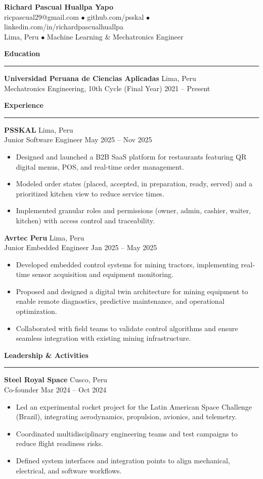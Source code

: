 \documentclass[11pt,letterpaper]{article}
\newcommand{\resumeheader}[3]{
    \begin{center}
        \textbf{#1} \\
        #2 \\
        #3
    \end{center}
}
\newcommand{\resumesection}[1]{
    \vspace{0.5em}
    \noindent\textbf{#1}
    \vspace{0.2em}
    \hrule
    \vspace{0.3em}
}
\newcommand{\resumeentry}[4]{
    \textbf{#1} \hfill #2 \\
    #3 \hfill #4
}
\newcommand{\resumesubentry}[1]{
    \begin{itemize}[leftmargin=*,topsep=0pt,itemsep=2pt]
        #1
    \end{itemize}
    \vspace{0.3em}
}
\begin{document}
\resumeheader{Richard Pascual Huallpa Yapo}{
    ricpascual29@gmail.com $\bullet$ github.com/psskal $\bullet$ linkedin.com/in/richardpascualhuallpa \\
    Lima, Peru $\bullet$ Machine Learning \& Mechatronics Engineer
}{}

\vspace{1em}

\resumesection{Education}

\resumeentry{Universidad Peruana de Ciencias Aplicadas}{Lima, Peru}
{Mechatronics Engineering, 10th Cycle (Final Year)}{2021 -- Present}

\resumesection{Experience}

\resumeentry{PSSKAL}{Lima, Peru}
{Junior Software Engineer}{May 2025 -- Nov 2025}
\resumesubentry{
    \item Designed and launched a B2B SaaS platform for restaurants featuring QR digital menus, POS, and real-time order management.
    \item Modeled order states (placed, accepted, in preparation, ready, served) and a prioritized kitchen view to reduce service times.
    \item Implemented granular roles and permissions (owner, admin, cashier, waiter, kitchen) with access control and traceability.
}

\resumeentry{Avrtec Peru}{Lima, Peru}
{Junior Embedded Engineer}{Jan 2025 -- May 2025}
\resumesubentry{
    \item Developed embedded control systems for mining tractors, implementing real-time sensor acquisition and equipment monitoring.
    \item Proposed and designed a digital twin architecture for mining equipment to enable remote diagnostics, predictive maintenance, and operational optimization.
    \item Collaborated with field teams to validate control algorithms and ensure seamless integration with existing mining infrastructure.
}

\resumesection{Leadership \& Activities}

\resumeentry{Steel Royal Space}{Cusco, Peru}
{Co-founder}{Mar 2024 -- Oct 2024}
\resumesubentry{
    \item Led an experimental rocket project for the Latin American Space Challenge (Brazil), integrating aerodynamics, propulsion, avionics, and telemetry.
    \item Coordinated multidisciplinary engineering teams and test campaigns to reduce flight readiness risks.
    \item Defined system interfaces and integration points to align mechanical, electrical, and software workflows.
}
\end{document}
